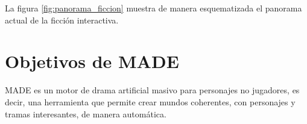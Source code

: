 

La figura \ref{fig:panorama_ficcion} muestra de manera esquematizada el panorama actual de la ficción interactiva.





\section{Objetivos de MADE}
\label{objetivos}

MADE es un motor de drama artificial masivo para personajes no jugadores, es decir, una herramienta que permite crear mundos coherentes, con personajes y tramas interesantes, de manera automática.
